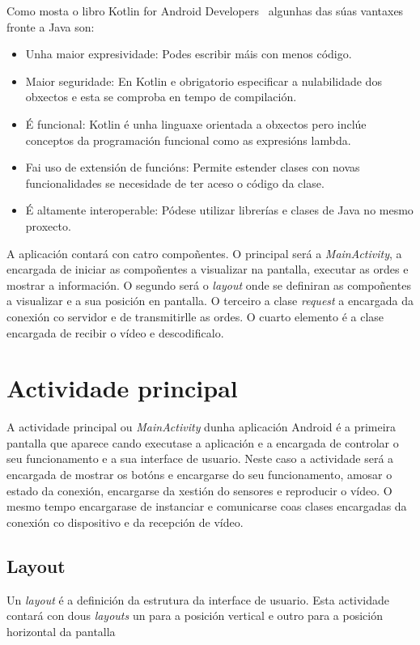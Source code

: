 Como mosta o libro Kotlin for Android Developers~\cite{leivaKotlinAndroidDevelopers2018} algunhas das súas vantaxes fronte a Java son:
\begin{itemize}
    \item Unha maior expresividade: Podes escribir máis con menos código.
    \item Maior seguridade: En Kotlin e obrigatorio especificar a nulabilidade dos obxectos e esta se comproba en tempo de compilación.
    \item É funcional: Kotlin é unha linguaxe orientada a obxectos pero inclúe conceptos da programación funcional como as expresións lambda.
    \item Fai uso de extensión de funcións: Permite estender clases con novas funcionalidades se necesidade de ter aceso o código da clase.
    \item É altamente interoperable: Pódese utilizar librerías e clases de Java no mesmo proxecto.
\end{itemize}


A aplicación contará con catro compoñentes. O principal será a \emph{MainActivity}, a encargada de iniciar as compoñentes a visualizar na pantalla, executar as ordes e mostrar a información. O segundo será o \emph{layout} onde se definiran as compoñentes a visualizar e a sua posición en pantalla. O terceiro a clase \emph{request} a encargada da conexión co servidor e de transmitirlle as ordes. O cuarto elemento é a clase encargada de recibir o vídeo e descodificalo.

\section{Actividade principal}
A actividade principal ou \emph{MainActivity} dunha aplicación Android é a primeira pantalla que aparece cando executase a aplicación e a encargada de controlar o seu funcionamento e a sua interface de usuario. Neste caso a actividade será a encargada de mostrar os botóns e encargarse do seu funcionamento, amosar o estado da conexión, encargarse da xestión do sensores e reproducir o vídeo. O mesmo tempo encargarase de instanciar e comunicarse coas clases encargadas da conexión co dispositivo e da recepción de vídeo.

\subsection{Layout}
Un \emph{layout} é a definición da estrutura da interface de usuario. Esta actividade contará con dous \emph{layouts} un para a posición vertical e outro para a posición horizontal da pantalla
